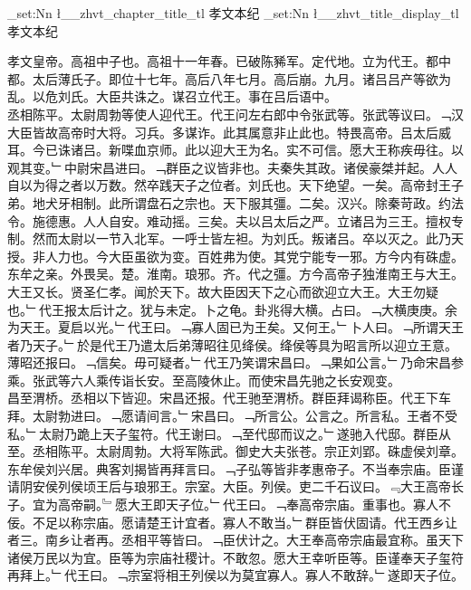 \documentclass{zhvt-classic}
\begin{document}
\clearpage
\ExplSyntaxOn
\tl_set:Nn \l__zhvt_chapter_title_tl { 孝文本纪 }
\tl_set:Nn \l__zhvt_title_display_tl { 孝文本纪 }
\ExplSyntaxOff
\maketitle






\hspace*{2em}孝文皇帝。高祖中子也。高祖十一年春。已破陈豨军。定代地。立为代王。都中都。太后薄氏子。即位十七年。高后八年七月。高后崩。九月。诸吕吕产等欲为乱。以危刘氏。大臣共诛之。谋召立代王。事在吕后语中。\\
\hspace*{2em}丞相陈平。太尉周勃等使人迎代王。代王问左右郎中令张武等。张武等议曰。﹁汉大臣皆故高帝时大将。习兵。多谋诈。此其属意非止此也。特畏高帝。吕太后威耳。今已诛诸吕。新喋血京师。此以迎大王为名。实不可信。愿大王称疾毋往。以观其变。﹂中尉宋昌进曰。﹁群臣之议皆非也。夫秦失其政。诸侯豪桀并起。人人自以为得之者以万数。然卒践天子之位者。刘氏也。天下绝望。一矣。高帝封王子弟。地犬牙相制。此所谓盘石之宗也。天下服其彊。二矣。汉兴。除秦苛政。约法令。施德惠。人人自安。难动摇。三矣。夫以吕太后之严。立诸吕为三王。擅权专制。然而太尉以一节入北军。一呼士皆左袒。为刘氏。叛诸吕。卒以灭之。此乃天授。非人力也。今大臣虽欲为变。百姓弗为使。其党宁能专一邪。方今内有硃虚。东牟之亲。外畏吴。楚。淮南。琅邪。齐。代之彊。方今高帝子独淮南王与大王。大王又长。贤圣仁孝。闻於天下。故大臣因天下之心而欲迎立大王。大王勿疑也。﹂代王报太后计之。犹与未定。卜之龟。卦兆得大横。占曰。﹁大横庚庚。余为天王。夏启以光。﹂代王曰。﹁寡人固已为王矣。又何王。﹂卜人曰。﹁所谓天王者乃天子。﹂於是代王乃遣太后弟薄昭往见绛侯。绛侯等具为昭言所以迎立王意。薄昭还报曰。﹁信矣。毋可疑者。﹂代王乃笑谓宋昌曰。﹁果如公言。﹂乃命宋昌参乘。张武等六人乘传诣长安。至高陵休止。而使宋昌先驰之长安观变。\\
\hspace*{2em}昌至渭桥。丞相以下皆迎。宋昌还报。代王驰至渭桥。群臣拜谒称臣。代王下车拜。太尉勃进曰。﹁愿请间言。﹂宋昌曰。﹁所言公。公言之。所言私。王者不受私。﹂太尉乃跪上天子玺符。代王谢曰。﹁至代邸而议之。﹂遂驰入代邸。群臣从至。丞相陈平。太尉周勃。大将军陈武。御史大夫张苍。宗正刘郢。硃虚侯刘章。东牟侯刘兴居。典客刘揭皆再拜言曰。﹁子弘等皆非孝惠帝子。不当奉宗庙。臣谨请阴安侯列侯顷王后与琅邪王。宗室。大臣。列侯。吏二千石议曰。﹃大王高帝长子。宜为高帝嗣。﹄愿大王即天子位。﹂代王曰。﹁奉高帝宗庙。重事也。寡人不佞。不足以称宗庙。愿请楚王计宜者。寡人不敢当。﹂群臣皆伏固请。代王西乡让者三。南乡让者再。丞相平等皆曰。﹁臣伏计之。大王奉高帝宗庙最宜称。虽天下诸侯万民以为宜。臣等为宗庙社稷计。不敢忽。愿大王幸听臣等。臣谨奉天子玺符再拜上。﹂代王曰。﹁宗室将相王列侯以为莫宜寡人。寡人不敢辞。﹂遂即天子位。\\
\end{document}

